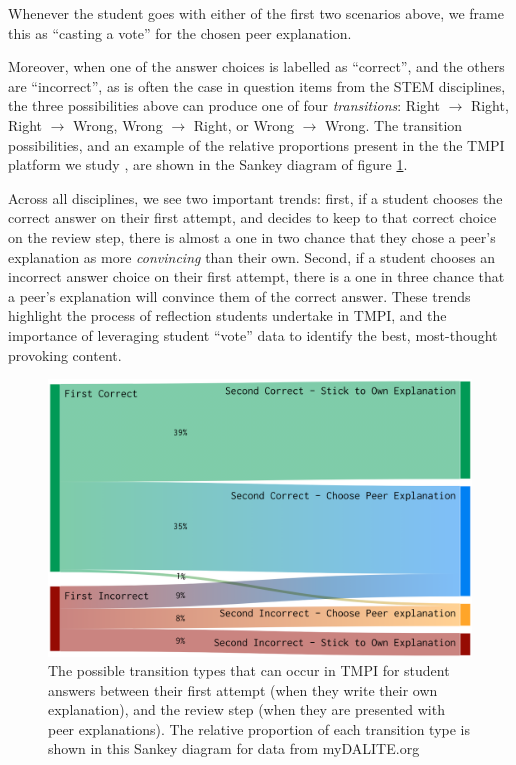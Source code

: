 \documentclass[notitlepage,12pt]{jedm}
\begin{document}
Whenever the student goes with either of the first two scenarios above, we 
frame this as ``casting a vote'' for the chosen peer explanation.

Moreover, when one of the answer choices is labelled as ``correct'', and the 
others are ``incorrect'', as is often the case in question items from the STEM 
disciplines, the three possibilities above can produce one of four 
\textit{transitions}: Right $\rightarrow$ Right, Right $\rightarrow$ Wrong, 
Wrong $\rightarrow$ Right, or Wrong $\rightarrow$ Wrong.
The transition possibilities, and an example of the relative proportions 
present in the the TMPI platform we study \cite{bhatnagar_dataset_2020}, are 
shown in the Sankey diagram of figure \ref{fig:tmpi_sankey}.

Across all disciplines, we see two important trends: first, if a student 
chooses the correct answer on their first attempt, and decides to keep to that 
correct choice on the review step, there is almost a one in two chance that 
they chose a peer's explanation as more \textit{convincing}  than their own. 
Second, if a student chooses an incorrect answer choice on their first attempt, 
there is a one in three chance that a peer's explanation will convince them of 
the correct answer.
These trends highlight the process of reflection students undertake in TMPI, 
and the importance of leveraging student ``vote'' data to identify the best, 
most-thought provoking content.

\begin{figure}[H]
	\centering
	\includegraphics[width=0.7\linewidth]{img/transitions_final.png}
	\caption{The possible transition types that can occur in TMPI for student 
	answers between their first attempt (when they write their own 
	explanation), and the review step (when they are presented with peer 
	explanations). 
	The relative proportion of each transition type is shown in this Sankey 
	diagram for data from myDALITE.org}
	\label{fig:tmpi_sankey}
\end{figure}
\end{document}
